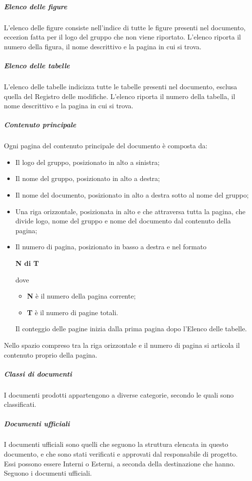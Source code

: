 \documentclass[../norme-di-progetto.tex]{subfiles}
\begin{document}
\subparagraph*{Elenco delle figure}
L'elenco delle figure consiste nell'indice di tutte le figure presenti nel documento, eccezion fatta per il logo del gruppo che non viene riportato. L'elenco riporta il numero della figura, il nome descrittivo e la pagina in cui si trova.

\subparagraph*{Elenco delle tabelle}
L'elenco delle tabelle indicizza tutte le tabelle presenti nel documento, esclusa quella del Registro delle modifiche. L'elenco riporta il numero della tabella, il nome  descrittivo e la pagina in cui si trova.

\subparagraph*{Contenuto principale}
Ogni pagina del contenuto principale del documento è composta da:
\begin{itemize}
  \item Il logo del gruppo, posizionato in alto a sinistra;
  \item Il nome del gruppo, posizionato in alto a destra;
  \item Il nome del documento, posizionato in alto a destra sotto al nome del gruppo;
  \item Una riga orizzontale, posizionata in alto e che attraversa tutta la pagina, che divide logo, nome del gruppo e nome del documento dal contenuto della pagina;
  \item Il numero di pagina, posizionato in basso a destra e nel formato \\ \begin{center}
    \centering
    \textbf{N di T}
  \end{center} dove
\begin{itemize}
  \item \textbf{N} è il numero della pagina corrente;
  \item \textbf{T} è il numero di pagine totali.
\end{itemize}
Il conteggio delle pagine inizia dalla prima pagina dopo l'Elenco delle tabelle.
\end{itemize}
Nello spazio compreso tra la riga orizzontale e il numero di pagina si articola il contenuto proprio della pagina.

\subparagraph{Classi di documenti}
I documenti prodotti appartengono a diverse categorie, secondo le quali sono classificati.

\subparagraph*{Documenti ufficiali}
I documenti ufficiali sono quelli che seguono la struttura elencata in questo documento, e che sono stati verificati e approvati dal responsabile di progetto. Essi possono essere Interni o Esterni, a seconda della destinazione che hanno. Seguono i documenti ufficiali.
\end{document}
